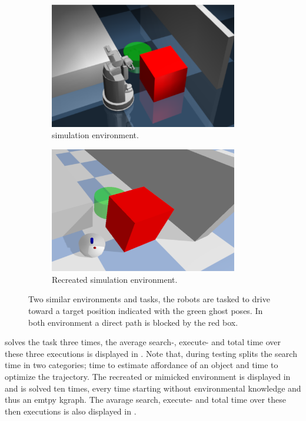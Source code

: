 \begin{figure}[H]
    \centering
    \begin{subfigure}{.49\textwidth}
    \centering
    \includegraphics[width=0.9\textwidth]{figures/results/wang_env}
    \caption{\citeauthor{wang_affordancebased_2020} simulation environment.}%
    \label{subfig:wang_env}
    \end{subfigure}
    \hfill
    \begin{subfigure}{.49\textwidth}
    \centering
    \includegraphics[width=0.9\textwidth]{figures/results/wang_mimick}
    \caption{Recreated simulation environment.}%
    \label{subfig:wang_mimick}
    \end{subfigure}
    \caption{Two similar environments and tasks, the robots are tasked to drive toward a target position indicated with the green ghost poses. In both environment a direct path is blocked by the red box.}%
    \label{fig:wang}
\end{figure}

\citeauthor{wang_affordancebased_2020} solves the task three times, the average search-, execute- and total time over these three executions is displayed in . Note that, during testing \citeauthor{wang_affordancebased_2020} splits the search time in two categories; time to estimate affordance of an object and time to optimize the trajectory. The recreated or mimicked environment is displayed in  and is solved ten times, every time starting without environmental knowledge and thus an emtpy \ac{kgraph}. The avarage search, execute- and total time over these then executions is also displayed in .\bs

